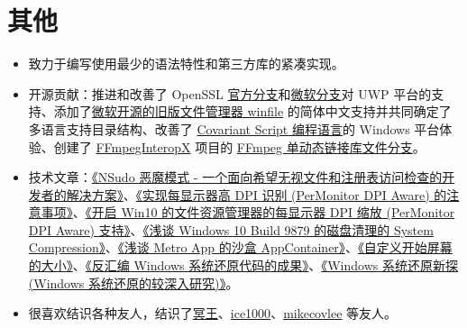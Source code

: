 \documentclass{resume}
\begin{document}
\section{其他}
\begin{itemize}

  \item 致力于编写使用最少的语法特性和第三方库的紧凑实现。

  \item 开源贡献：推进和改善了 OpenSSL \href{https://github.com/openssl/openssl/pulls?q=is:pr+author:MouriNaruto+}{官方分支}和\href{https://github.com/microsoft/openssl/pulls?q=is:pr+author:MouriNaruto+}{微软分支}对 UWP 平台的支持、添加了\href{https://github.com/microsoft/winfile/pulls?q=is:pr+author:MouriNaruto+}{微软开源的旧版文件管理器 winfile} 的简体中文支持并共同确定了多语言支持目录结构、改善了 \href{https://github.com/covscript/covscript/pulls?q=is:pr+author:MouriNaruto+}{Covariant Script 编程语言}的 Windows 平台体验、创建了 \href{https://github.com/ffmpeginteropx/FFmpegInteropX/pulls?q=is:pr+author:MouriNaruto+}{FFmpegInteropX} 项目的 \href{https://github.com/ffmpeginteropx/FFmpegInteropX/tree/FFmpegUniversal}{FFmpeg 单动态链接库文件分支}。
  
  \item 技术文章：\href{https://bbs.pediy.com/thread-257345.htm}{《NSudo 恶魔模式 - 一个面向希望无视文件和注册表访问检查的开发者的解决方案》}、\href{https://www.52pojie.cn/thread-512713-1-1.html}{《实现每显示器高 DPI 识别 (Per\-Monitor DPI Aware) 的注意事项》}、\href{https://www.52pojie.cn/thread-506556-1-1.html}{《开启 Win10 的文件资源管理器的每显示器 DPI 缩放 (Per\-Monitor DPI Aware) 支持》}、\href{http://bbs.pcbeta.com/viewthread-1567726-1-1.html}{《浅谈 Windows 10 Build 9879 的磁盘清理的 System Compression》}、\href{http://bbs.pcbeta.com/viewthread-1611980-1-1.html}{《浅谈 Metro App 的沙盒 AppContainer》}、\href{http://bbs.pcbeta.com/viewthread-1524688-1-1.html}{《自定义开始屏幕的大小》}、\href{http://bbs.pcbeta.com/viewthread-1535789-1-1.html}{《反汇编 Windows 系统还原代码的成果》}、\href{http://bbs.pcbeta.com/viewthread-1507617-1-1.html}{《Windows 系统还原新探 (Windows 系统还原的较深入研究)》}。
  
  \item 很喜欢结识各种友人，结识了\href{https://github.com/mingkuang-Chuyu}{冥王}、\href{https://github.com/ice1000/}{ice1000}、\href{https://github.com/mikecovlee}{mikecovlee} 等友人。

\end{itemize}
\end{document}
